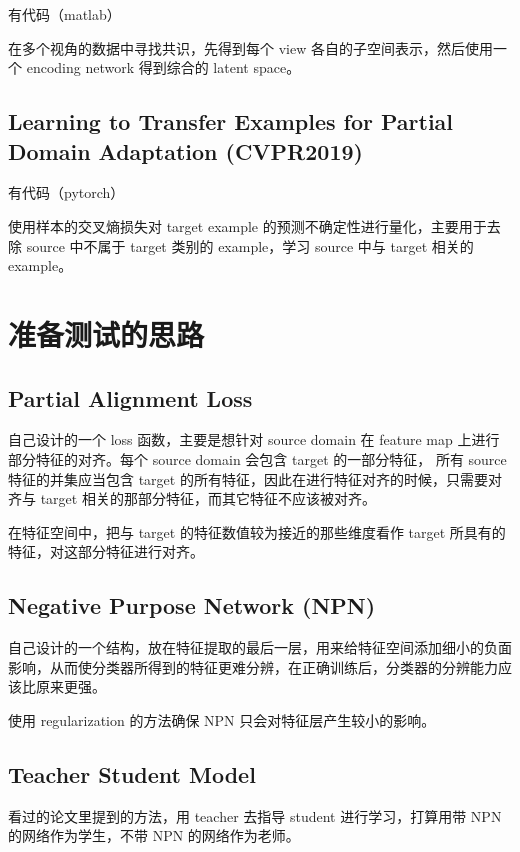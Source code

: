 \documentclass[UTF8]{ctexart}
\begin{document}
有代码（matlab）

在多个视角的数据中寻找共识，先得到每个 view 各自的子空间表示，然后使用一个 encoding network 得到综合的 latent space。

\subsection{Learning to Transfer Examples for Partial Domain Adaptation (CVPR2019)}

有代码（pytorch）

使用样本的交叉熵损失对 target example 的预测不确定性进行量化，主要用于去除 source 中不属于 target 类别的 example，学习 source 中与 target 相关的 example。

\section{准备测试的思路}

\subsection{Partial Alignment Loss}

自己设计的一个 loss 函数，主要是想针对 source domain 在 feature map 上进行部分特征的对齐。每个 source domain 会包含 target 的一部分特征，
所有 source 特征的并集应当包含 target 的所有特征，因此在进行特征对齐的时候，只需要对齐与 target 相关的那部分特征，而其它特征不应该被对齐。

在特征空间中，把与 target 的特征数值较为接近的那些维度看作 target 所具有的特征，对这部分特征进行对齐。

\subsection{Negative Purpose Network (NPN)}

自己设计的一个结构，放在特征提取的最后一层，用来给特征空间添加细小的负面影响，从而使分类器所得到的特征更难分辨，在正确训练后，分类器的分辨能力应该比原来更强。

使用 regularization 的方法确保 NPN 只会对特征层产生较小的影响。

\subsection{Teacher Student Model}

看过的论文里提到的方法，用 teacher 去指导 student 进行学习，打算用带 NPN 的网络作为学生，不带 NPN 的网络作为老师。
\end{document}
